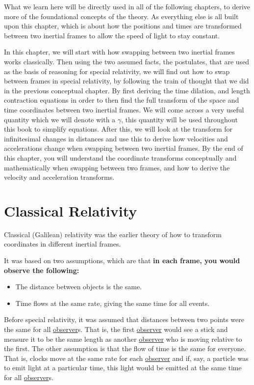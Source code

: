 What we learn here will be directly used in all of the following chapters, to derive more of the foundational concepts of the theory.
As everything else is all built upon this chapter, which is about how the positions and times are transformed between two inertial frames to allow the speed of light to stay constant.

In this chapter, we will start with how swapping between two inertial frames works classically.
Then using the two assumed facts, the postulates, that are used as the basis of reasoning for special relativity, we will find out how to swap between frames in special relativity, by following the train of thought that we did in the previous conceptual chapter.
By first deriving the time dilation, and length contraction equations in order to then find the full transform of the space and time coordinates between two inertial frames.
We will come across a very useful quantity which we will denote with a ${\gamma}$, this quantity will be used throughout this book to simplify equations.
After this, we will look at the transform for infinitesimal changes in distances and use this to derive how velocities and accelerations change when swapping between two inertial frames.
By the end of this chapter, you will understand the coordinate transforms conceptually and mathematically when swapping between two frames, and how to derive the velocity and acceleration transforms.

\section{Classical Relativity} \label{sect: Classical Relativity}

Classical (Galilean) relativity was the earlier theory of how to transform coordinates in different inertial frames.

It was based on two assumptions, which are that \textbf{in each frame, you would observe the following:}

\begin{itemize}
	\item The distance between objects is the same.
	\item Time flows at the same rate, giving the same time for all events.
\end{itemize}

Before special relativity, it was assumed that distances between two points were the same for all \hyperlink{def-observer}{observer}s.
That is, the first \hyperlink{def-observer}{observer} would see a stick and measure it to be the same length as another \hyperlink{def-observer}{observer} who is moving relative to the first.
The other assumption is that the flow of time is the same for everyone.
That is, clocks move at the same rate for each \hyperlink{def-observer}{observer} and if, say, a particle was to emit light at a particular time, this light would be emitted at the same time for all \hyperlink{def-observer}{observer}s.

